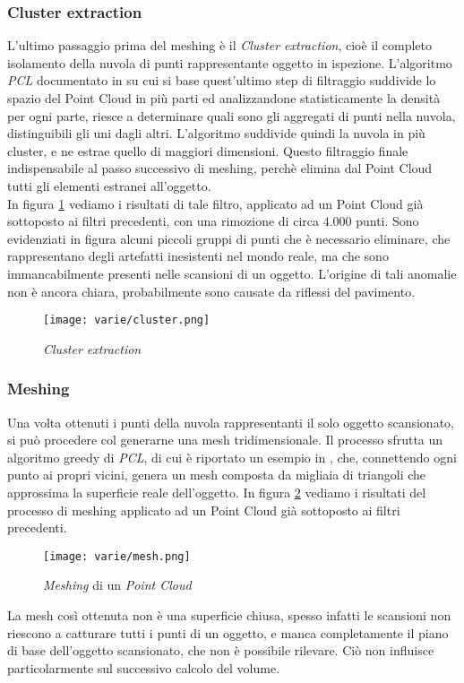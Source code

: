 \subsubsection{Cluster extraction}
L'ultimo passaggio prima del meshing è il \emph{Cluster extraction}, cioè il completo isolamento della nuvola di punti rappresentante oggetto in ispezione.
L'algoritmo \emph{PCL} documentato in \cite{site:cluster} su cui si base quest'ultimo step di filtraggio suddivide lo spazio del Point Cloud in più parti ed analizzandone statisticamente la densità per ogni parte, riesce a determinare quali sono  gli aggregati di punti nella nuvola, distinguibili gli uni dagli altri.
L'algoritmo suddivide quindi la nuvola in più cluster, e ne estrae quello di maggiori dimensioni. Questo filtraggio finale indispensabile al passo successivo di meshing, perchè elimina dal Point Cloud tutti gli elementi estranei all'oggetto.\\
In figura \ref{fig:cluster} vediamo i risultati di tale filtro, applicato ad un Point Cloud già sottoposto ai filtri precedenti, con una rimozione di circa 4.000 punti. Sono evidenziati in figura alcuni piccoli gruppi di punti che è necessario eliminare, che rappresentano degli artefatti inesistenti nel mondo reale, ma che sono immancabilmente presenti nelle scansioni di un oggetto. L'origine di tali anomalie non è ancora chiara, probabilmente sono causate da riflessi del pavimento.
\begin{figure}[!h] 
    \centering 
    \texttt{[image: varie/cluster.png]} 
    \caption{\emph{Cluster extraction}}
    \label{fig:cluster}
\end{figure}

\subsubsection{Meshing}
Una volta ottenuti i punti della nuvola rappresentanti il solo oggetto scansionato, si può procedere col generarne una mesh tridimensionale.
Il processo sfrutta un algoritmo greedy di \emph{PCL}, di cui è riportato un esempio in \cite{site:meshing}, che, connettendo ogni punto ai propri vicini, genera un mesh composta da migliaia di triangoli che approssima la superficie reale dell'oggetto.
In figura \ref{fig:mesh} vediamo i risultati del processo di meshing applicato ad un Point Cloud già sottoposto ai filtri precedenti.
\begin{figure}[!h] 
    \centering 
    \texttt{[image: varie/mesh.png]} 
    \caption{\emph{Meshing} di un \emph{Point Cloud}}
    \label{fig:mesh}
\end{figure}
\newline
La mesh così ottenuta non è una superficie chiusa, spesso infatti le scansioni non riescono a catturare tutti i punti di un oggetto, e manca completamente il piano di base dell'oggetto scansionato, che non è possibile rilevare. Ciò non influisce particolarmente sul successivo calcolo del volume.

